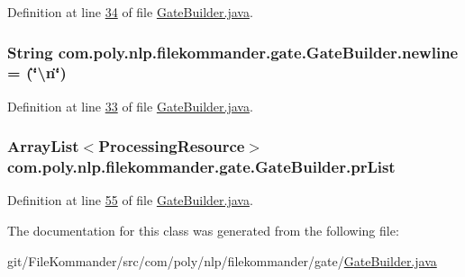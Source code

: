 Definition at line \hyperlink{L34}{34} of file \hyperlink{}{Gate\-Builder.\-java}.

\hypertarget{classcom_1_1poly_1_1nlp_1_1filekommander_1_1gate_1_1_gate_builder_a6a44fefbc1299f76aca84b037f79bd35}{
\subsubsection[{newline}]{\setlength{\rightskip}{0pt plus 5cm}String com.\-poly.\-nlp.\-filekommander.\-gate.\-Gate\-Builder.\-newline = (\char`\"{}\textbackslash{}n\char`\"{})\hspace{0.3cm}{\ttfamily [static]}}}\label{classcom_1_1poly_1_1nlp_1_1filekommander_1_1gate_1_1_gate_builder_a6a44fefbc1299f76aca84b037f79bd35}


Definition at line \hyperlink{L33}{33} of file \hyperlink{}{Gate\-Builder.\-java}.

\hypertarget{classcom_1_1poly_1_1nlp_1_1filekommander_1_1gate_1_1_gate_builder_a4e56ddc3afefb48e751266e1e6449b7f}{
\subsubsection[{pr\-List}]{\setlength{\rightskip}{0pt plus 5cm}Array\-List$<${\bf Processing\-Resource}$>$ com.\-poly.\-nlp.\-filekommander.\-gate.\-Gate\-Builder.\-pr\-List\hspace{0.3cm}{\ttfamily [private]}}}\label{classcom_1_1poly_1_1nlp_1_1filekommander_1_1gate_1_1_gate_builder_a4e56ddc3afefb48e751266e1e6449b7f}


Definition at line \hyperlink{L55}{55} of file \hyperlink{}{Gate\-Builder.\-java}.



The documentation for this class was generated from the following file\-:\begin{DoxyCompactItemize}
\item 
git/\-File\-Kommander/src/com/poly/nlp/filekommander/gate/\hyperlink{_gate_builder_8java}{Gate\-Builder.\-java}\end{DoxyCompactItemize}
